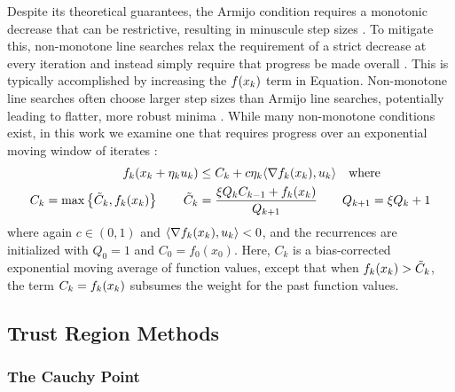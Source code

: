 Despite its theoretical guarantees, the Armijo condition requires a monotonic decrease that can be restrictive, resulting in minuscule step sizes \cite{nocedal2006numerical}.
To mitigate this, non-monotone line searches relax the requirement of a strict decrease at every iteration and instead simply require that progress be made overall
\cite{zhang2004nonmonotone,galli2023monotone,fox2024nonmonotone,grippo1986nonmonotone,dai2002nonmonotone,huynh1993nonmonotone,ernesto2000nonmonotone}. This is typically accomplished by increasing the $f(x_{k})$ term in
Equation. Non-monotone line searches often choose larger step sizes than Armijo line searches, potentially leading to flatter, more robust minima \cite{fox2024nonmonotone}.
While many non-monotone conditions exist, in this work we examine one that requires progress over an exponential moving window of iterates \cite{zhang2004nonmonotone,galli2023monotone}:
\begin{equation}
	\begin{split}
		f_k(x_{k} + \eta_{k} u_{k}) &\le C_k + c \eta_{k} \langle \nabla f_k(x_{k}), u_{k} \rangle
		\quad \text{where} \\
			C_k = \max \left\{ \tilde C_k, f_k(x_k) \right\} \qquad
			\tilde C_k &= \frac{\xi Q_k C_{k-1} + f_k(x_k)}{Q_{k+1}} \qquad
			Q_{k + 1} = \xi Q_k + 1
	\end{split}
	\label{eq:nonmonotone_condition}
\end{equation}
where again $c \in (0, 1)$ and $\langle \nabla f_k(x_{k}), u_{k} \rangle < 0$, and the recurrences are initialized with $Q_0 = 1$ and $C_0 = f_0(x_0)$. Here, $C_k$ is a bias-corrected exponential moving average of function values, except that when $f_k(x_{k}) > \tilde C_k$, the term $C_k = f_k(x_{k})$ subsumes the weight for the past function values.

\subsection{Trust Region Methods}

\subsubsection{The Cauchy Point}


\renewcommand{\bibname}{References}

